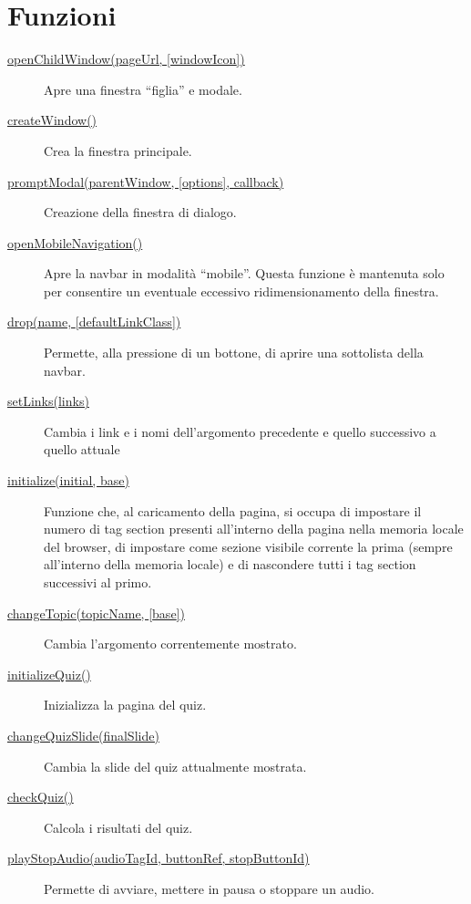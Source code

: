 \hypertarget{functions}{%
\section{Funzioni}\label{functions}}

\begin{description}
\item[{ \protect\hyperlink{openChildWindow}{openChildWindow(pageUrl,
{[}windowIcon{]})} }]
Apre una finestra ``figlia'' e modale.
\item[{ \protect\hyperlink{createWindow}{createWindow()} }]
Crea la finestra principale.
\item[{ \protect\hyperlink{promptModal}{promptModal(parentWindow,
{[}options{]}, callback)} }]
Creazione della finestra di dialogo.
\item[{ \protect\hyperlink{openMobileNavigation}{openMobileNavigation()}
}]
Apre la navbar in modalità ``mobile''. Questa funzione è mantenuta solo
per consentire un eventuale eccessivo ridimensionamento della finestra.
\item[{ \protect\hyperlink{drop}{drop(name, {[}defaultLinkClass{]})} }]
Permette, alla pressione di un bottone, di aprire una sottolista della
navbar.
\item[{ \protect\hyperlink{setLinks}{setLinks(links)} }]
Cambia i link e i nomi dell'argomento precedente e quello successivo a
quello attuale
\item[{ \protect\hyperlink{initialize}{initialize(initial, base)} }]
Funzione che, al caricamento della pagina, si occupa di impostare il
numero di tag section presenti all'interno della pagina nella memoria
locale del browser, di impostare come sezione visibile corrente la prima
(sempre all'interno della memoria locale) e di nascondere tutti i tag
section successivi al primo.
\item[{ \protect\hyperlink{changeTopic}{changeTopic(topicName,
{[}base{]})} }]
Cambia l'argomento correntemente mostrato.
\item[{ \protect\hyperlink{initializeQuiz}{initializeQuiz()} }]
Inizializza la pagina del quiz.
\item[{ \protect\hyperlink{changeQuizSlide}{changeQuizSlide(finalSlide)}
}]
Cambia la slide del quiz attualmente mostrata.
\item[{ \protect\hyperlink{checkQuiz}{checkQuiz()} }]
Calcola i risultati del quiz.
\item[{ \protect\hyperlink{playStopAudio}{playStopAudio(audioTagId,
buttonRef, stopButtonId)} }]
Permette di avviare, mettere in pausa o stoppare un audio.

\end{description}
